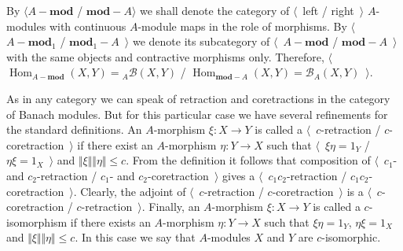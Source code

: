 By $\langle A-\mathbf{mod}$ / $\mathbf{mod}-A\rangle$ we shall denote the
category of $\langle$~left / right~$\rangle$ $A$-modules with continuous
$A$-module maps in the role of morphisms. By $\langle$~$A-\mathbf{mod}_1$ /
$\mathbf{mod}_1-A$~$\rangle$ we denote its subcategory of
$\langle$~$A-\mathbf{mod}$ / $\mathbf{mod}-A$~$\rangle$ with the same objects
and contractive morphisms only. Therefore,
$\langle$~$\operatorname{Hom}_{A-\mathbf{mod}}(X,Y)={}_A\mathcal{B}(X,Y)$ /
$\operatorname{Hom}_{\mathbf{mod}-A}(X,Y)=\mathcal{B}_A(X,Y)$~$\rangle$. 

As in any category we can speak of retraction and coretractions in the
category of Banach modules. But for this particular case we have several
refinements for the standard definitions. An $A$-morphism $\xi:X\to Y$ is called
a $\langle$~$c$-retraction / $c$-coretraction~$\rangle$ if there exist an
$A$-morphism $\eta:Y\to X$ such that $\langle$~$\xi\eta=1_Y$ /
$\eta\xi=1_X$~$\rangle$ and $\Vert\xi\Vert\Vert\eta\Vert\leq c$. From the
definition it follows that composition of $\langle$~$c_1$- and $c_2$-retraction
/ $c_1$- and $c_2$-coretraction~$\rangle$ gives a $\langle$~$c_1c_2$-retraction
/ $c_1c_2$-coretraction~$\rangle$. Clearly, the adjoint of
$\langle$~$c$-retraction / $c$-coretraction~$\rangle$ is a
$\langle$~$c$-coretraction / $c$-retraction~$\rangle$. Finally, an $A$-morphism
$\xi:X\to Y$ is called a $c$-isomorphism if there exists an $A$-morphism
$\eta:Y\to X$ such that $\xi\eta=1_Y$, $\eta\xi=1_X$ and
$\Vert\xi\Vert\Vert\eta\Vert\leq c$. In this case we say that $A$-modules $X$
and $Y$ are $c$-isomorphic.

